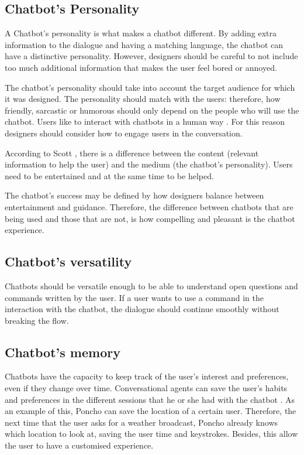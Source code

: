 \documentclass[a4paper,10pt]{article}
\begin{document}
\subsection*{Chatbot's Personality}

A Chatbot’s personality is what makes a chatbot different. By adding extra information to the dialogue and having a matching language, the chatbot can have a distinctive personality. However, designers should be careful to not include too much additional information that makes the user feel bored or annoyed. 

The chatbot’s personality should take into account the target audience for which it was designed. The personality should match with the users: therefore, how friendly, sarcastic or humorous should only depend on the people who will use the chatbot. Users like to interact with chatbots in a human way \cite{HeuristicsWebPage}. For this reason designers should consider how to engage users in the conversation. 

According to Scott \cite{HeuristicsWebPage}, there is a difference between the content (relevant information to help the user) and the medium (the chatbot’s personality). Users need to be entertained and at the same time to be helped.

The chatbot’s success may be defined by how designers balance between entertainment and guidance. Therefore, the difference between chatbots that are being used and those that are not, is how compelling and pleasant is the chatbot experience.   

\subsection*{Chatbot's versatility}

Chatbots should be versatile enough to be able to understand open questions and commands written by the user. If a user wants to use a command in the interaction with the chatbot, the dialogue should continue smoothly without breaking the flow.

\subsection*{Chatbot's memory}

Chatbots have the capacity to keep track of the user's interest and preferences, even if they change over time. Conversational agents can save the user's habits and preferences in the different sessions that he or she had with the chatbot \cite{shneiderman1997direct}. As an example of this, Poncho can save the location of a certain user. Therefore, the next time that the user asks for a weather broadcast, Poncho already knows which location to look at, \cite{poncho2017} saving the user time and keystrokes. Besides, this allow the user to have a customised experience. 
\end{document}
